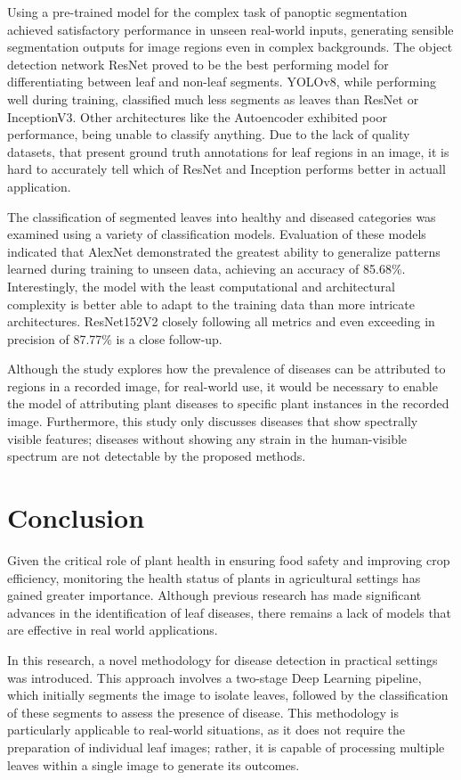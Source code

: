\documentclass[draft,final]{vutinfth} %
\begin{document}
Using a pre-trained model for the complex task of panoptic segmentation achieved satisfactory performance in unseen real-world inputs, generating sensible segmentation outputs for image regions even in complex backgrounds. 
The object detection network ResNet proved to be the best performing model for differentiating between leaf and non-leaf segments. YOLOv8, while performing well during training, classified much less segments as leaves than ResNet or InceptionV3. Other architectures like the Autoencoder exhibited poor performance, being unable to classify anything. Due to the lack of quality datasets, that present ground truth annotations for leaf regions in an image, it is hard to accurately tell which of ResNet and Inception performs better in actuall application.

The classification of segmented leaves into healthy and diseased categories was examined using a variety of classification models. Evaluation of these models indicated that AlexNet demonstrated the greatest ability to generalize patterns learned during training to unseen data, achieving an accuracy of 85.68\%. Interestingly, the model with the least computational and architectural complexity is better able to adapt to the training data than more intricate architectures. ResNet152V2 closely following all metrics and even exceeding in precision of 87.77\% is a close follow-up. 

Although the study explores how the prevalence of diseases can be attributed to regions in a recorded image, for real-world use, it would be necessary to enable the model of attributing plant diseases to specific plant instances in the recorded image. Furthermore, this study only discusses diseases that show spectrally visible features; diseases without showing any strain in the human-visible spectrum are not detectable by the proposed methods. 

\chapter{Conclusion}
Given the critical role of plant health in ensuring food safety and improving crop efficiency, monitoring the health status of plants in agricultural settings has gained greater importance. Although previous research has made significant advances in the identification of leaf diseases, there remains a lack of models that are effective in real world applications.

In this research, a novel methodology for disease detection in practical settings was introduced. This approach involves a two-stage Deep Learning pipeline, which initially segments the image to isolate leaves, followed by the classification of these segments to assess the presence of disease. This methodology is particularly applicable to real-world situations, as it does not require the preparation of individual leaf images; rather, it is capable of processing multiple leaves within a single image to generate its outcomes. 
\end{document}
